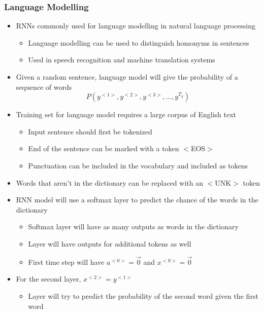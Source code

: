 \documentclass[12pt, letterpaper]{article}
\begin{document}
    \subsubsection{Language Modelling}
    \begin{itemize}
        \item RNNs commonly used for language modelling in natural language processing
        \begin{itemize}
            \item Language modelling can be used to distinguish homonyms in sentences
            \item Used in speech recognition and machine translation systems
        \end{itemize}
        \item Given a random sentence, language model will give the probability of a sequence of words
        $$P(y^{<1>}, y^{<2>},y^{<3>},...,y^{T_y})$$ 
        \item Training set for language model requires a large corpus of English text
        \begin{itemize}
            \item Input sentence should first be tokenized
            \item End of the sentence can be marked with a token $<$EOS$>$
            \item Punctuation can be included in the vocabulary and included as tokens
        \end{itemize}
        \item Words that aren't in the dictionary can be replaced with an $<$UNK$>$ token 
        \item RNN model will use a softmax layer to predict the chance of the words in the dictionary
        \begin{itemize}
            \item Softmax layer will have as many outputs as words in the dictionary 
            \item Layer will have outputs for additional tokens as well
            \item First time step will have $a^{<0>}=\overrightarrow{0}$ and $x^{<0>}=\overrightarrow{0}$
        \end{itemize} 
        \item For the second layer, $x^{<2>}=y^{<1>}$
        \begin{itemize}
            \item Layer will try to predict the probability of the second word given the first word

\end{itemize}
\end{itemize}
\end{document}
